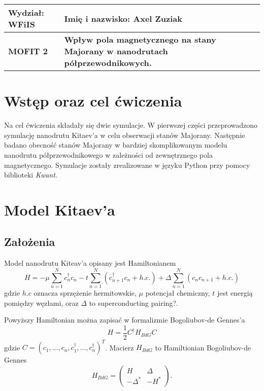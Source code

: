 \documentclass[a4paper, 12pt]{article}
\begin{document}

\begin{table}[h]
	\centering
	\begin{tabular}{|C{3cm}|L{12cm}|} \hline
		Wydział: \textbf{WFiIS} & Imię i nazwisko: \textbf{Axel Zuziak} \\ \hline
		\textbf{MOFIT 2} & \textbf{Wpływ pola magnetycznego na stany Majorany w nanodrutach półprzewodnikowych.} \\ \hline
	\end{tabular}
\end{table}




\section{Wstęp oraz cel ćwiczenia}

Na cel ćwiczenia składały się dwie symulacje. W pierwszej części przeprowadzono symulację nanodrutu Kitaev'a w celu obserwacji stanów Majorany. Następnie badano obecność stanów Majorany w bardziej skomplikowanym modelu nanodrutu półprzewodnikowego w zależności od zewnętrznego pola magnetycznego. Symulacje zostały zrealizowane w języku Python przy pomocy biblioteki \emph{Kwant}.

\section{Model Kitaev'a}
\subsection{Założenia}

Model nanodrutu Kiteav'a opisany jest Hamiltonianem
\begin{equation}
    H = -\mu \sum_{n=1}^{N} c^{\dag}_n c_n - t\sum_{n=1}^{N} (c^{\dag}_{n+1} c_n + h.c.) + \Delta \sum_{n=1}^{N} (c_n c_{n+1} + h.c.)
    \label{eq:kitaev}
\end{equation}
gdzie $h.c$ oznacza sprzężenie hermitowskie, $\mu$ potencjał chemiczny, $t$ jest energią pomiędzy węzłami, oraz $\Delta$ to superconducting pairing?.

Powyższy Hamiltonian można zapisać w formalizmie Bogoliubov-de Gennes'a
\begin{equation}
    H = \frac{1}{2}C^{\dag} H_{BdG} C
\end{equation}
gdzie $C = (c_1,...,c_n,c^{\dag}_1,...,c^{\dag}_n)^T$.
Macierz $H_{BdG}$ to Hamiltionian Bogoliubov-de Gennes
\begin{equation}
    H_{BdG} = \begin{pmatrix}
        H & \Delta \\
        -\Delta^{*} & -H^{*}
    \end{pmatrix}.
\end{equation}
\end{document}
